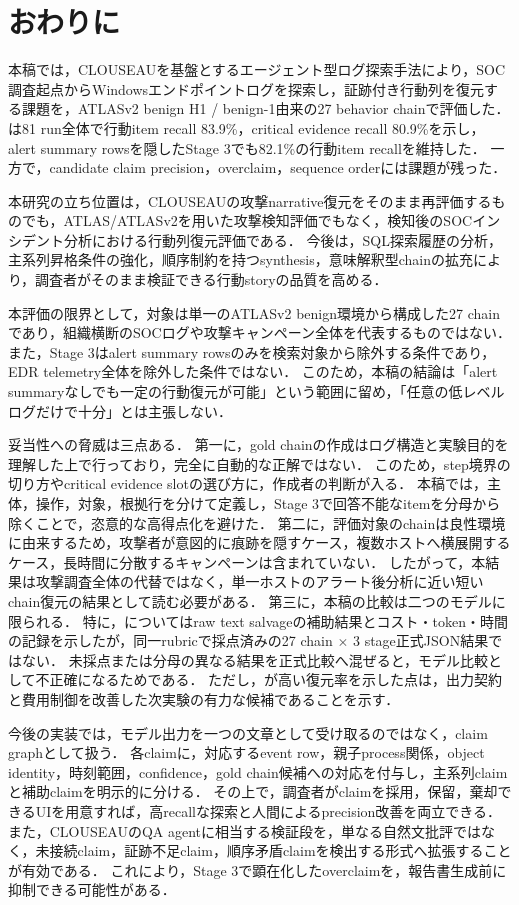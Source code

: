 

\section{おわりに}

本稿では，CLOUSEAUを基盤とするエージェント型ログ探索手法により，SOC調査起点からWindowsエンドポイントログを探索し，証跡付き行動列を復元する課題を，ATLASv2 benign H1 / benign-1由来の27 behavior chainで評価した．
は81 run全体で行動item recall 83.9\%，critical evidence recall 80.9\%を示し，alert summary rowsを隠したStage 3でも82.1\%の行動item recallを維持した．
一方で，candidate claim precision，overclaim，sequence orderには課題が残った．

本研究の立ち位置は，CLOUSEAUの攻撃narrative復元をそのまま再評価するものでも，ATLAS/ATLASv2を用いた攻撃検知評価でもなく，検知後のSOCインシデント分析における行動列復元評価である．
今後は，SQL探索履歴の分析，主系列昇格条件の強化，順序制約を持つsynthesis，意味解釈型chainの拡充により，調査者がそのまま検証できる行動storyの品質を高める．

本評価の限界として，対象は単一のATLASv2 benign環境から構成した27 chainであり，組織横断のSOCログや攻撃キャンペーン全体を代表するものではない．
また，Stage 3はalert summary rowsのみを検索対象から除外する条件であり，EDR telemetry全体を除外した条件ではない．
このため，本稿の結論は「alert summaryなしでも一定の行動復元が可能」という範囲に留め，「任意の低レベルログだけで十分」とは主張しない．

妥当性への脅威は三点ある．
第一に，gold chainの作成はログ構造と実験目的を理解した上で行っており，完全に自動的な正解ではない．
このため，step境界の切り方やcritical evidence slotの選び方に，作成者の判断が入る．
本稿では，主体，操作，対象，根拠行を分けて定義し，Stage 3で回答不能なitemを分母から除くことで，恣意的な高得点化を避けた．
第二に，評価対象のchainは良性環境に由来するため，攻撃者が意図的に痕跡を隠すケース，複数ホストへ横展開するケース，長時間に分散するキャンペーンは含まれていない．
したがって，本結果は攻撃調査全体の代替ではなく，単一ホストのアラート後分析に近い短いchain復元の結果として読む必要がある．
第三に，本稿の比較は二つのモデルに限られる．
特に，についてはraw text salvageの補助結果とコスト・token・時間の記録を示したが，同一rubricで採点済みの27 chain $\times$ 3 stage正式JSON結果ではない．
未採点または分母の異なる結果を正式比較へ混ぜると，モデル比較として不正確になるためである．
ただし，が高い復元率を示した点は，出力契約と費用制御を改善した次実験の有力な候補であることを示す．

今後の実装では，モデル出力を一つの文章として受け取るのではなく，claim graphとして扱う．
各claimに，対応するevent row，親子process関係，object identity，時刻範囲，confidence，gold chain候補への対応を付与し，主系列claimと補助claimを明示的に分ける．
その上で，調査者がclaimを採用，保留，棄却できるUIを用意すれば，高recallな探索と人間によるprecision改善を両立できる．
また，CLOUSEAUのQA agentに相当する検証段を，単なる自然文批評ではなく，未接続claim，証跡不足claim，順序矛盾claimを検出する形式へ拡張することが有効である．
これにより，Stage 3で顕在化したoverclaimを，報告書生成前に抑制できる可能性がある．


